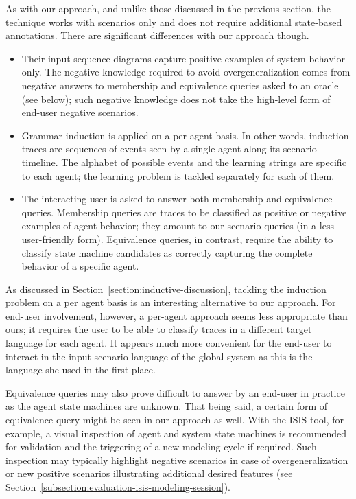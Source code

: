 As with our approach, and unlike those discussed in the previous section, the technique works with scenarios only and does not require additional state-based annotations. There are significant differences with our approach though.
\begin{itemize}

\item Their input sequence diagrams capture positive examples of system behavior only. The negative knowledge required to avoid overgeneralization comes from negative answers to membership and equivalence queries asked to an oracle (see below); such negative knowledge does not take the high-level form of end-user negative scenarios.

\item Grammar induction is applied on a per agent basis. In other words, induction traces are sequences of events seen by a single agent along its scenario timeline. The alphabet of possible events and the learning strings are specific to each agent; the learning problem is tackled separately for each of them.

\item The interacting user is asked to answer both membership and equivalence queries. Membership queries are traces to be classified as positive or negative examples of agent behavior; they amount to our scenario queries (in a less user-friendly form). Equivalence queries, in contrast, require the ability to classify state machine candidates as correctly capturing the complete behavior of a specific agent.
\end{itemize}

As discussed in Section~\ref{section:inductive-discussion}, tackling the induction problem on a per agent basis is an interesting alternative to our approach. For end-user involvement, however, a per-agent approach seems less appropriate than ours; it requires the user to be able to classify traces in a different target language for each agent. It appears much more convenient for the end-user to interact in the input scenario language of the global system as this is the language she used in the first place.

Equivalence queries may also prove difficult to answer by an end-user in practice as the agent state machines are unknown. That being said, a certain form of equivalence query might be seen in our approach as well. With the ISIS tool, for example, a visual inspection of agent and system state machines is recommended for validation and the triggering of a new modeling cycle if required. Such inspection may typically highlight negative scenarios in case of overgeneralization or new positive scenarios illustrating additional desired features (see Section~\ref{subsection:evaluation-isis-modeling-session}).

